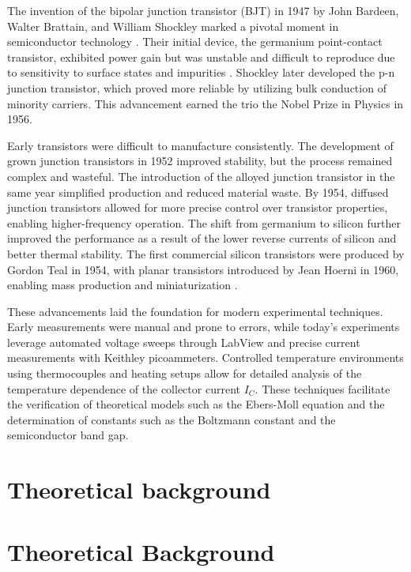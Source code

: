 \documentclass[12pt,letterpaper,onecolumn]{article}
\begin{document}
The invention of the bipolar junction transistor (BJT) in 1947 by John Bardeen, Walter Brattain, and William Shockley marked a pivotal moment in semiconductor technology \cite{Neudeck}. Their initial device, the germanium point-contact transistor, exhibited power gain but was unstable and difficult to reproduce due to sensitivity to surface states and impurities \cite{Lukasiak}. Shockley later developed the p-n junction transistor, which proved more reliable by utilizing bulk conduction of minority carriers. This advancement earned the trio the Nobel Prize in Physics in 1956.

Early transistors were difficult to manufacture consistently. The development of grown junction transistors in 1952 improved stability, but the process remained complex and wasteful. The introduction of the alloyed junction transistor in the same year simplified production and reduced material waste. By 1954, diffused junction transistors allowed for more precise control over transistor properties, enabling higher-frequency operation. The shift from germanium to silicon further improved the performance as a result of the lower reverse currents of silicon and better thermal stability. The first commercial silicon transistors were produced by Gordon Teal in 1954, with planar transistors introduced by Jean Hoerni in 1960, enabling mass production and miniaturization \cite{Lukasiak}.

These advancements laid the foundation for modern experimental techniques. Early measurements were manual and prone to errors, while today's experiments leverage automated voltage sweeps through LabView and precise current measurements with Keithley picoammeters. Controlled temperature environments using thermocouples and heating setups allow for detailed analysis of the temperature dependence of the collector current \( I_C \). These techniques facilitate the verification of theoretical models such as the Ebers-Moll equation and the determination of constants such as the Boltzmann constant and the semiconductor band gap.


\section{Theoretical background}

\section{Theoretical Background}
\end{document}
